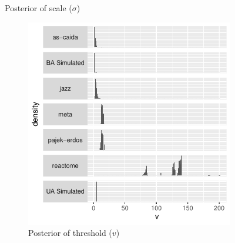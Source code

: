 \documentclass[
  10pt,
  a4paper,
]{scrreprt}
\theoremstyle{definition}
\theoremstyle{plain}
\theoremstyle{plain}
\theoremstyle{plain}
\theoremstyle{remark}
\begin{document}
{\begin{figure}[H]
{}

\caption{\label{fig-scale}Posterior of scale (\(\sigma\))}

\end{figure}

\begin{figure}

\begin{minipage}[t]{0.50\linewidth}

{\centering 

\begin{figure}[H]

{\centering \includegraphics[width=1\textwidth,height=\textheight]{doc_files/figure-pdf/fig-thresh-1.pdf}

}

\caption{\label{fig-thresh}Posterior of threshold (\(v\))}

\end{figure}

}

\end{minipage}%
%
\begin{minipage}[t]{0.50\linewidth}

{\centering 

\begin{figure}[H]


\end{figure}}
\end{minipage}
\end{figure}}
\end{document}
